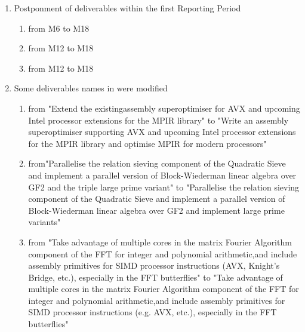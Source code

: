 \begin{enumerate}
\item Postponment of deliverables within the first Reporting Period
\begin{enumerate}
\item {} from M6 to M18
\item {} from M12 to M18
\item {} from M12 to M18
\end{enumerate}

\item Some deliverables names in  were modified
\begin{enumerate}
\item {} from "Extend the existingassembly superoptimiser
for AVX and upcoming Intel processor extensions for the MPIR library" to "Write an assembly
superoptimiser supporting AVX and upcoming Intel processor extensions for the MPIR library
and optimise MPIR for modern processors"
\item {} from"Parallelise the relation sieving component of the
Quadratic Sieve and implement a parallel version of Block-Wiederman linear algebra over GF2
and the triple large prime variant" to "Parallelise the relation sieving component of the
Quadratic Sieve and implement a parallel version of Block-Wiederman linear algebra over GF2
and implement large prime variants"
\item {} from "Take advantage of multiple cores in the matrix Fourier Algorithm
component of the FFT for integer and polynomial arithmetic,and include assembly primitives for
SIMD processor instructions (AVX, Knight's Bridge, etc.), especially in the FFT butterflies" to
"Take advantage of multiple cores in the matrix Fourier Algorithm component of the FFT for
integer and polynomial arithmetic,and include assembly primitives for SIMD processor
instructions (e.g. AVX, etc.), especially in the FFT butterflies"
\end{enumerate}

\end{enumerate}

\clearpage
\thispagestyle{empty}
